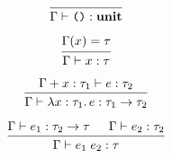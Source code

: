 \documentclass[12pt]{article}
\begin{document}
\pagestyle{empty}

\[
    \begin{prooftree}
        \infer0{\Gamma \vdash \text{\texttt{()}}: \mathbf{unit}}
    \end{prooftree}
\]

\[
    \begin{prooftree}
        \hypo{\Gamma(x) = \tau}
        \infer1{\Gamma \vdash x: \tau}
    \end{prooftree}
\]

\[
    \begin{prooftree}
        \hypo{\Gamma + x:\tau_1 \vdash e: \tau_2}
        \infer1{\Gamma \vdash \lambda x:\tau_1\ldotp e: \tau_1 \to \tau_2}
    \end{prooftree}
\]

\[
    \begin{prooftree}
        \hypo{\Gamma \vdash e_1: \tau_2 \to \tau}
        \hypo{\Gamma \vdash e_2: \tau_2}
        \infer2{\Gamma \vdash e_1\; e_2: \tau}
    \end{prooftree}
\]
\end{document}
